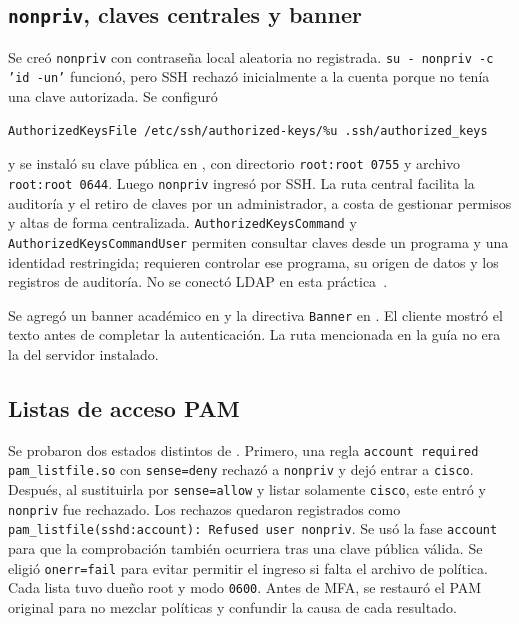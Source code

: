 \documentclass[11pt,a4paper]{article}
\begin{document}
\subsection{\texttt{nonpriv}, claves centrales y banner}
Se creó \texttt{nonpriv} con contraseña local aleatoria no registrada.
\texttt{su - nonpriv -c 'id -un'} funcionó, pero SSH rechazó inicialmente a la
cuenta porque no tenía una clave autorizada. Se configuró
\begin{verbatim}
AuthorizedKeysFile /etc/ssh/authorized-keys/%u .ssh/authorized_keys
\end{verbatim}
y se instaló su clave pública en ,
con directorio \texttt{root:root 0755} y archivo \texttt{root:root 0644}. Luego
\texttt{nonpriv} ingresó por SSH. La ruta central facilita la auditoría y el
retiro de claves por un administrador, a costa de gestionar permisos y altas
de forma centralizada. \texttt{AuthorizedKeysCommand} y
\texttt{AuthorizedKeysCommandUser} permiten consultar claves desde un
programa y una identidad restringida; requieren controlar ese programa, su
origen de datos y los registros de auditoría. No se conectó LDAP en esta
práctica~\cite{openssh-man}.

Se agregó un banner académico en  y la directiva
\texttt{Banner} en . El cliente
mostró el texto antes de completar la autenticación. La ruta
 mencionada en la guía no era la del servidor instalado.

\subsection{Listas de acceso PAM}
Se probaron dos estados distintos de . Primero, una regla
\texttt{account required pam\_listfile.so} con \texttt{sense=deny} rechazó a
\texttt{nonpriv} y dejó entrar a \texttt{cisco}. Después, al sustituirla por
\texttt{sense=allow} y listar solamente \texttt{cisco}, este entró y
\texttt{nonpriv} fue rechazado. Los rechazos quedaron registrados como
\texttt{pam\_listfile(sshd:account): Refused user nonpriv}. Se usó la fase
\texttt{account} para que la comprobación también ocurriera tras una clave
pública válida. Se eligió \texttt{onerr=fail} para evitar permitir el ingreso
si falta el archivo de política. Cada lista tuvo dueño root y modo
\texttt{0600}. Antes de MFA, se restauró el PAM original para no mezclar
políticas y confundir la causa de cada resultado.
\end{document}
